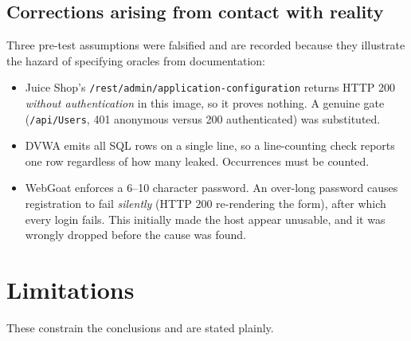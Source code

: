 \documentclass[11pt,a4paper]{report}
\newcommand{\code}[1]{\texttt{\small #1}}
\begin{document}
\section{Corrections arising from contact with reality}
\label{sec:corrections}
Three pre-test assumptions were falsified and are recorded because they
illustrate the hazard of specifying oracles from documentation:
\begin{itemize}[leftmargin=*]
  \item Juice Shop's \code{/rest/admin/application-configuration} returns HTTP
  200 \emph{without authentication} in this image, so it proves nothing. A
  genuine gate (\code{/api/Users}, 401 anonymous versus 200 authenticated) was
  substituted.
  \item DVWA emits all SQL rows on a single line, so a line-counting check
  reports one row regardless of how many leaked. Occurrences must be counted.
  \item WebGoat enforces a 6--10 character password. An over-long password causes
  registration to fail \emph{silently} (HTTP 200 re-rendering the form), after
  which every login fails. This initially made the host appear unusable, and it
  was wrongly dropped before the cause was found.
\end{itemize}

\chapter{Limitations}
\label{ch:limits}

These constrain the conclusions and are stated plainly.
\end{document}
